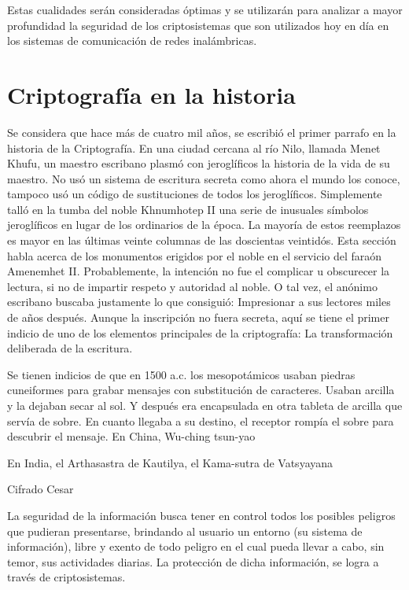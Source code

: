 Estas cualidades serán consideradas óptimas y se utilizarán para analizar a mayor profundidad la seguridad de los criptosistemas que son utilizados hoy en día en los sistemas de comunicación de redes inalámbricas.

\section{Criptografía en la historia}
Se considera que hace más de cuatro mil años, se escribió el primer parrafo en la historia de la Criptografía. En una ciudad cercana al río Nilo, llamada Menet Khufu, un maestro escribano plasmó con jeroglíficos la historia de la vida de su maestro. No usó un sistema de escritura secreta como ahora el mundo los conoce, tampoco usó un código de sustituciones de todos los jeroglíficos. Simplemente talló en la tumba del noble Khnumhotep II una serie de inusuales símbolos jeroglíficos en lugar de los ordinarios de la época. La mayoría de estos reemplazos es mayor en las últimas veinte columnas de las doscientas veintidós. Esta sección habla acerca de los monumentos erigidos por el noble en el servicio del faraón Amenemhet II.
Probablemente, la intención no fue el complicar u obscurecer la lectura, si no de impartir respeto y autoridad al noble. O tal vez, el anónimo escribano buscaba justamente lo que consiguió: Impresionar a sus lectores miles de años después. Aunque la inscripción no fuera secreta, aquí se tiene el primer indicio de uno de los elementos principales de la criptografía: La transformación deliberada de la escritura.

Se tienen indicios de que en 1500 a.c. los mesopotámicos usaban piedras cuneiformes para grabar mensajes con substitución de caracteres. Usaban arcilla y la dejaban secar al sol. Y después era encapsulada en otra tableta de arcilla que servía de sobre. En cuanto llegaba a su destino, el receptor rompía el sobre para descubrir el mensaje. En China, Wu-ching tsun-yao 

En India, el Arthasastra de Kautilya, el Kama-sutra de Vatsyayana


Cifrado Cesar



La seguridad de la información busca tener en control todos los posibles peligros que pudieran presentarse, brindando al usuario un entorno (su sistema de información), libre y exento de todo peligro en el cual pueda llevar a cabo, sin temor, sus actividades diarias. La protección de dicha información, se logra a través de criptosistemas.

